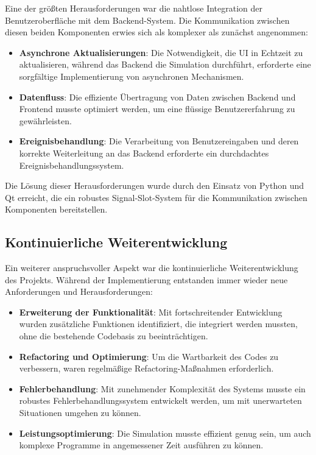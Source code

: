 \documentclass[a4paper,11pt]{report}
\begin{document}
Eine der größten Herausforderungen war die nahtlose Integration der Benutzeroberfläche mit dem Backend-System. Die Kommunikation zwischen diesen beiden Komponenten erwies sich als komplexer als zunächst angenommen:

\begin{itemize}
    \item \textbf{Asynchrone Aktualisierungen}: Die Notwendigkeit, die UI in Echtzeit zu aktualisieren, während das Backend die Simulation durchführt, erforderte eine sorgfältige Implementierung von asynchronen Mechanismen.
    \item \textbf{Datenfluss}: Die effiziente Übertragung von Daten zwischen Backend und Frontend musste optimiert werden, um eine flüssige Benutzererfahrung zu gewährleisten.
    \item \textbf{Ereignisbehandlung}: Die Verarbeitung von Benutzereingaben und deren korrekte Weiterleitung an das Backend erforderte ein durchdachtes Ereignisbehandlungssystem.
\end{itemize}

Die Lösung dieser Herausforderungen wurde durch den Einsatz von Python und Qt erreicht, die ein robustes Signal-Slot-System für die Kommunikation zwischen Komponenten bereitstellen.

\subsection{Kontinuierliche Weiterentwicklung}

Ein weiterer anspruchsvoller Aspekt war die kontinuierliche Weiterentwicklung des Projekts. Während der Implementierung entstanden immer wieder neue Anforderungen und Herausforderungen:

\begin{itemize}
    \item \textbf{Erweiterung der Funktionalität}: Mit fortschreitender Entwicklung wurden zusätzliche Funktionen identifiziert, die integriert werden mussten, ohne die bestehende Codebasis zu beeinträchtigen.
    \item \textbf{Refactoring und Optimierung}: Um die Wartbarkeit des Codes zu verbessern, waren regelmäßige Refactoring-Maßnahmen erforderlich.
    \item \textbf{Fehlerbehandlung}: Mit zunehmender Komplexität des Systems musste ein robustes Fehlerbehandlungssystem entwickelt werden, um mit unerwarteten Situationen umgehen zu können.
    \item \textbf{Leistungsoptimierung}: Die Simulation musste effizient genug sein, um auch komplexe Programme in angemessener Zeit ausführen zu können.
\end{itemize}
\end{document}
